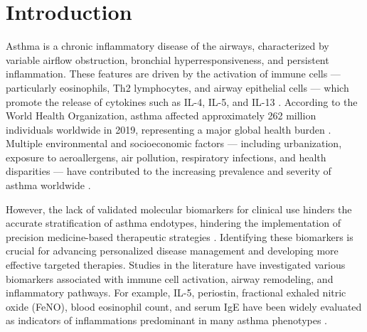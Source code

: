 
\section{Introduction}

Asthma is a chronic inflammatory disease of the airways, characterized by variable airflow obstruction, bronchial hyperresponsiveness, and persistent inflammation. These features are driven by the activation of immune cells — particularly eosinophils, Th2 lymphocytes, and airway epithelial cells — which promote the release of cytokines such as IL-4, IL-5, and IL-13 %
\cite{hamid_inflammatory_2003}. According to the World Health Organization, asthma affected approximately 262 million individuals worldwide in 2019, representing a major global health burden %
\cite{vos_2020}. Multiple environmental and socioeconomic factors — including urbanization, exposure to aeroallergens, air pollution, respiratory infections, and health disparities — have contributed to the increasing prevalence and severity of asthma worldwide %
\cite{ni_long-term_2024,zheng_regional_2018,goldin_asthma_2025,checkley_what_2019,chatkin_external_2022}.

However, the lack of validated molecular biomarkers for clinical use hinders the accurate stratification of asthma endotypes, hindering the implementation of precision medicine-based therapeutic strategies %
\cite{skloot_asthma_2016,cremades-jimeno_prioritizing_2021}. Identifying these biomarkers is crucial for advancing personalized disease management and developing more effective targeted therapies. Studies in the literature have investigated various biomarkers associated with immune cell activation, airway remodeling, and inflammatory pathways. For example, IL-5, periostin, fractional exhaled nitric oxide (FeNO), blood eosinophil count, and serum IgE have been widely evaluated as indicators of inflammations predominant in many asthma phenotypes %
\cite{dweik_official_2011,price_blood_2015}.

